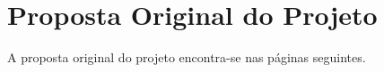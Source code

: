 \chapter{Proposta Original do Projeto}
\label{apendice1}

A proposta original do projeto encontra-se nas páginas seguintes.

\clearpage
